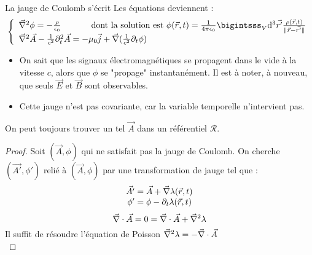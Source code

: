 	La jauge de Coulomb s'écrit 
	Les équations deviennent :
$$
	\left\{ \begin{array}{l}
		\nab^2\phi=-\frac{\rho}{\epsilon_0} \text{ \hspace{1cm} dont la solution est } \phi(\vec{r},t)=\frac{1}{4\pi\epsilon_0}\bigintsss_V\dif^3\vec{r'}\frac{\rho(\vec{r},t)}{\parallel\vec{r}-\vec{r'}\parallel}\\
		\nab^2\vec{A}-\frac{1}{c^2}\partial_t^2\vec{A}=-\mu_0\vec{j}+\nab(\frac{1}{c^2}\partial_t\phi)	
	\end{array} \right.
$$
	
	\begin{remarks}
		\hspace{1pt}
		\begin{itemize}
			\item On sait que les signaux électromagnétiques se propagent dans le vide à la vitesse $c$, alors que $\phi$ se "propage" instantanément. Il est à noter, à nouveau, que seuls $\vec{E}$ et $\vec{B}$ sont observables.
			\item Cette jauge n'est pas covariante, car la variable temporelle n'intervient pas.
		\end{itemize}
	\end{remarks}
	
	\begin{theorem}
		On peut toujours trouver un tel $\vec{A}$ dans un référentiel $\mathcal{R}$.
	\end{theorem}
	
	\begin{proof}
		Soit $(\vec{A},\phi)$ qui ne satisfait pas la jauge de Coulomb. On cherche $(\vec{A'},\phi')$ relié à $(\vec{A},\phi)$ par une transformation de jauge tel que :
$$
		\begin{array}{r@{\;}l}
				\vec{A'} &=\vec{A}+\nab\lambda(\vec{r},t)\\
			\phi'&=\phi-\partial_t\lambda(\vec{r},t)
		\end{array}
$$
$$
		\vec{\nabla}\cdot\vec{A}=0=\vec{\nabla}\cdot\vec{A}+\vec{\nabla}^2\lambda
$$
	Il suffit de résoudre l'équation de Poisson $\vec{\nabla}^2\lambda=-\vec{\nabla}\cdot\vec{A}$ \\\qedhere
	\end{proof}
	
